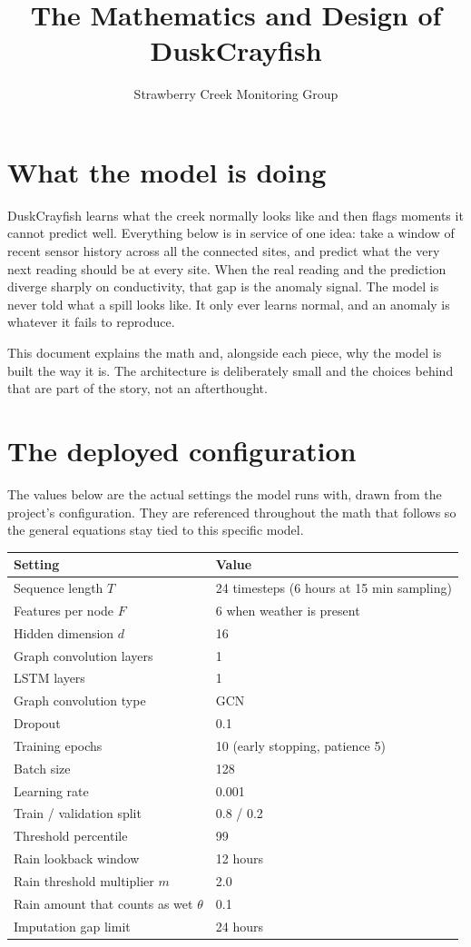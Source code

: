 \documentclass[11pt]{article}
\title{The Mathematics and Design of DuskCrayfish}
\author{Strawberry Creek Monitoring Group}
\date{}
\begin{document}
\maketitle

\section*{What the model is doing}

DuskCrayfish learns what the creek normally looks like and then flags moments it cannot predict well. Everything below is in service of one idea: take a window of recent sensor history across all the connected sites, and predict what the very next reading should be at every site. When the real reading and the prediction diverge sharply on conductivity, that gap is the anomaly signal. The model is never told what a spill looks like. It only ever learns normal, and an anomaly is whatever it fails to reproduce.

This document explains the math and, alongside each piece, why the model is built the way it is. The architecture is deliberately small and the choices behind that are part of the story, not an afterthought.

\section*{The deployed configuration}

The values below are the actual settings the model runs with, drawn from the project's configuration. They are referenced throughout the math that follows so the general equations stay tied to this specific model.

\begin{center}
\begin{tabular}{ll}
\toprule
Setting & Value \\
\midrule
Sequence length $T$ & 24 timesteps (6 hours at 15 min sampling) \\
Features per node $F$ & 6 when weather is present \\
Hidden dimension $d$ & 16 \\
Graph convolution layers & 1 \\
LSTM layers & 1 \\
Graph convolution type & GCN \\
Dropout & 0.1 \\
Training epochs & 10 (early stopping, patience 5) \\
Batch size & 128 \\
Learning rate & 0.001 \\
Train / validation split & 0.8 / 0.2 \\
Threshold percentile & 99 \\
Rain lookback window & 12 hours \\
Rain threshold multiplier $m$ & 2.0 \\
Rain amount that counts as wet $\theta$ & 0.1 \\
Imputation gap limit & 24 hours \\
\bottomrule
\end{tabular}
\end{center}
\end{document}

